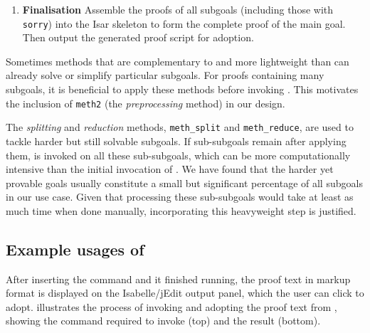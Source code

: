 \documentclass[10pt,conference]{IEEEtran}
\begin{document}
\begin{enumerate}
        Second, for each remaining sub-subgoal: try to prove the sub-subgoal using \sledgehammer{}. {If successful}, return \sledgehammer{}'s proof text. If not, return text indicating a failure to find a proof.
        
        Finally, combine all sub-subgoals' returned proofs if they all succeeded. If any of the \sledgehammer{} calls failed, use placeholder text to indicate failed proof. Return the combined (or failed) text.

    \item \textbf{Finalisation}
         Assemble the proofs of all subgoals (including those with \texttt{sorry}) into the Isar skeleton to form the complete proof of the main goal. 
         Then output the generated proof script for adoption.
\end{enumerate}
\noindent
Sometimes methods that are complementary to and more lightweight than \sledgehammer{} can already solve or simplify particular subgoals.
For proofs containing many subgoals, it is beneficial to apply these methods before invoking \sledgehammer{}. This motivates the inclusion of \texttt{meth2} (the \emph{preprocessing} method) in our design.

The \emph{splitting} and \emph{reduction} methods, \texttt{meth\_split} and \texttt{meth\_reduce}, are used to tackle harder but still solvable subgoals. If sub-subgoals remain after applying them, \sledgehammer{} is invoked on all these sub-subgoals, which can be more computationally intensive than the initial invocation of \sledgehammer{}.
We have found that the harder yet provable goals usually constitute a small but significant percentage of all subgoals in our use case. Given that processing these sub-subgoals would take at least as much time when done manually, incorporating this heavyweight step is justified. 

\subsection{Example usages of \supersketch{}}
After inserting the \supersketch{} command and it finished running, the proof text in markup format is displayed on the Isabelle/jEdit output panel,  which the user can click to adopt.
illustrates the process of invoking and adopting the proof text from \supersketch{}, showing the command required to invoke \supersketch{} (top) and the result (bottom).
\end{document}

